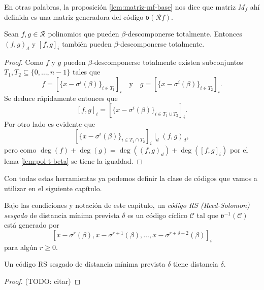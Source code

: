 En otras palabras, la proposición \ref{lem:matriz-mf-base} nos dice que matriz \(M_f\) ahí definida es una matriz generadora del código \(\mathfrak v(\mathcal R f)\).

\begin{lemma}
  \label{lem:b-descomposicion-mcm-mcd}
  Sean \(f, g \in \mathcal R\) polinomios que pueden \(\beta\)-descomponerse totalmente.
  Entonces \((f, g)_d\) y \([f, g]_i\) también pueden \(\beta\)-descomponerse totalmente.
\end{lemma}

\begin{proof}
  Como \(f\) y \(g\) pueden \(\beta\)-descomponerse totalmente existen subconjuntos \(T_1, T_2 \subseteq \{0, \dots, n - 1\}\) tales que 
  \[
    f = \left[\{x - \sigma^i(\beta)\}_{i \in T_1}\right]_i \quad \text{y} \quad g = \left[\{x - \sigma^i(\beta)\}_{i \in T_2}\right]_i.
  \]
  Se deduce rápidamente entonces que
  \[
    [f, g]_i = \left[\{x - \sigma^i(\beta)\}_{i \in T_1 \cup T_2}\right]_i.
  \]
  Por otro lado es evidente que 
  \[
    \left[\{x - \sigma^i(\beta)\}_{i \in T_1 \cap T_2}\right]_i \mid_d (f, g)_d,
  \]
  pero como \(\deg(f) + \deg(g) = \deg((f, g)_d) + \deg([f, g]_i)\) por el lema \ref{lem:pol-t-beta} se tiene la igualdad.
\end{proof}

Con todas estas herramientas ya podemos definir la clase de códigos que vamos a utilizar en el siguiente capítulo.

\begin{definition}
  Bajo las condiciones y notación de este capítulo, un \emph{código RS (Reed-Solomon) sesgado} de distancia mínima prevista \(\delta\) es un código cíclico \(\mathcal C\) tal que \(\mathfrak v^{-1}(\mathcal C)\) está generado por 
  \[
    \left[x - \sigma^r(\beta), x - \sigma^{r+1}(\beta), \dots, x - \sigma^{r+\delta-2}(\beta)\right]_i
  \] 
  para algún \(r \geq 0\).
\end{definition}

\begin{theorem}
  \label{th:distancia-skew-rs}
  Un código RS sesgado de distancia mínima prevista \(\delta\) tiene distancia \(\delta\).
\end{theorem}

\begin{proof}
  (TODO: citar)
\end{proof}